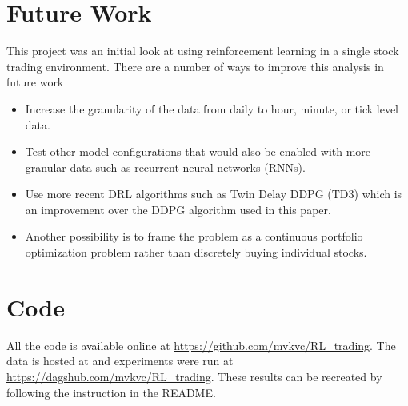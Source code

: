 \documentclass[a4paper]{article}
\begin{document}
\section{Future Work}

This project was an initial look at using reinforcement learning in a single stock trading environment. There are a number of ways to improve this analysis in future work

\begin{itemize}
	\item Increase the granularity of the data from daily to hour, minute, or tick level data.
	\item Test other model configurations that would also be enabled with more granular data such as recurrent neural networks (RNNs).
	\item Use more recent DRL algorithms such as Twin Delay DDPG (TD3) which is an improvement over the DDPG algorithm used in this paper.
	\item Another possibility is to frame the problem as a continuous portfolio optimization problem rather than discretely buying individual stocks.
\end{itemize}

\section{Code}

All the code is available online at \url{https://github.com/mvkvc/RL_trading}. The data is hosted at and experiments were run at \url{https://dagshub.com/mvkvc/RL_trading}. These results can be recreated by following the instruction in the README.
\end{document}
